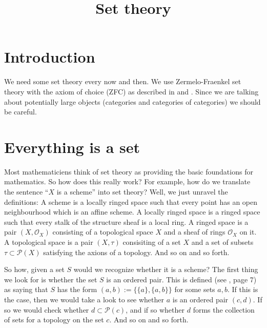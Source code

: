 

%


\title{Set theory}


\maketitle

\tableofcontents

\section{Introduction}
\label{section-introduction}

\noindent
We need some set theory every now and then. We use Zermelo-Fraenkel set theory
with the axiom of choice (ZFC) as described in \cite{Kunen} and \cite{Jech}.
Since we are talking about potentially large objects
(categories and categories of categories) we should be careful.

\section{Everything is a set}
\label{section-sets-everything}

\noindent
Most mathematiciens think of set theory as providing the basic
foundations for mathematics. So how does this really work?
For example, how do we translate the sentence
``$X$ is a scheme'' into set theory? Well, we just unravel the
definitions: A scheme is a locally ringed space such that every
point has an open neighbourhood which is an affine scheme. 
A locally ringed space is a ringed space such that every stalk
of the structure sheaf is a local ring. A ringed space is
a pair $(X, \mathcal{O}_X)$ consisting of a topological space
$X$ and a sheaf of rings $\mathcal{O}_X$ on it. A topological
space is a pair $(X, \tau)$ consisiting of a set
$X$ and a set of subsets $\tau \subset \mathcal{P}(X)$ 
satisfying the axions of a topology. And so on and
so forth.

\medskip\noindent
So how, given a set $S$ would we recognize whether it is a scheme?
The first thing we look for is whether the set $S$ is an ordered pair.
This is defined (see \cite{Jech}, page 7) as saying that $S$
has the form $(a,b) := \{\{a\},\{a,b\}\}$ for some sets $a, b$. If this is
the case, then we would take a look to see whether $a$ is an
ordered pair $(c,d)$. If so we would check whether 
$d \subset \mathcal{P}(c)$, and if so whether $d$ forms the collection
of sets for a topology on the set $c$. And so on and so forth.

